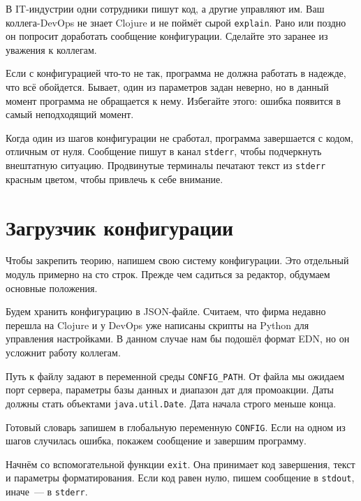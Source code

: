 
В IT-индустрии одни сотрудники пишут код, а другие управляют им. Ваш
коллега-DevOps не знает Clojure и не поймёт сырой \verb|explain|. Рано или
поздно он попросит доработать сообщение конфигурации. Сделайте это заранее из
уважения к коллегам.

Если с конфигурацией что-то не так, программа не должна работать в надежде, что
всё обойдется. Бывает, один из параметров задан неверно, но в данный момент
программа не обращается к нему. Избегайте этого: ошибка появится в самый
неподходящий момент.


Когда один из шагов конфигурации не сработал, программа завершается с кодом,
отличным от нуля. Сообщение пишут в канал \verb|stderr|, чтобы подчеркнуть
внештатную ситуацию. Продвинутые терминалы печатают текст из \verb|stderr|
красным цветом, чтобы привлечь к себе внимание.

\section{Загрузчик конфигурации}


Чтобы закрепить теорию, напишем свою систему конфигурации. Это отдельный модуль
примерно на сто строк. Прежде чем садиться за редактор, обдумаем основные
положения.

Будем хранить конфигурацию в JSON-файле. Считаем, что фирма недавно перешла на
Clojure и у DevOps уже написаны скрипты на Python для управления настройками. В
данном случае нам бы подошёл формат EDN, но он усложнит работу коллегам.


Путь к файлу задают в переменной среды \verb|CONFIG_PATH|. От файла мы ожидаем
порт сервера, параметры базы данных и диапазон дат для промоакции. Даты должны
стать объектами \verb|java.util.Date|. Дата начала строго меньше конца.

Готовый словарь запишем в глобальную переменную \verb|CONFIG|. Если на одном
из шагов случилась ошибка, покажем сообщение и завершим программу.

Начнём со вспомогательной функции \verb|exit|. Она принимает код завершения,
текст и параметры форматирования. Если код равен нулю, пишем сообщение в
\verb|stdout|, иначе~--- в \verb|stderr|.


